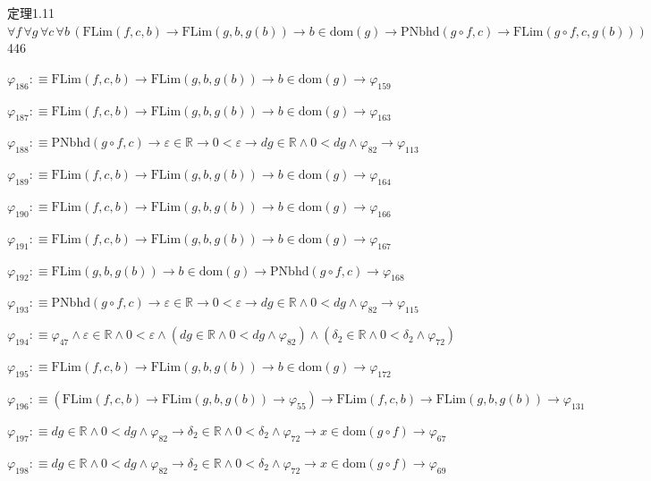 \begin{fullproof}{定理1.11}{$\forall f\,\forall g\,\forall c\,\forall b\,(\mathrm{FLim}(f,c,b) \to \mathrm{FLim}(g,b,g(b)) \to b \in \mathrm{dom}(g) \to \mathrm{PNbhd}(g \circ f,c) \to \mathrm{FLim}(g \circ f,c,g(b)))$}{446}
\begin{abbrevlist}
\item $\varphi_{186} :\equiv \mathrm{FLim}(f,c,b) \to \mathrm{FLim}(g,b,g(b)) \to b \in \mathrm{dom}(g) \to \varphi_{159}$
\item $\varphi_{187} :\equiv \mathrm{FLim}(f,c,b) \to \mathrm{FLim}(g,b,g(b)) \to b \in \mathrm{dom}(g) \to \varphi_{163}$
\item $\varphi_{188} :\equiv \mathrm{PNbhd}(g \circ f,c) \to \varepsilon \in \mathbb{R} \to 0 < \varepsilon \to \mathit{dg} \in \mathbb{R} \land 0 < \mathit{dg} \land \varphi_{82} \to \varphi_{113}$
\item $\varphi_{189} :\equiv \mathrm{FLim}(f,c,b) \to \mathrm{FLim}(g,b,g(b)) \to b \in \mathrm{dom}(g) \to \varphi_{164}$
\item $\varphi_{190} :\equiv \mathrm{FLim}(f,c,b) \to \mathrm{FLim}(g,b,g(b)) \to b \in \mathrm{dom}(g) \to \varphi_{166}$
\item $\varphi_{191} :\equiv \mathrm{FLim}(f,c,b) \to \mathrm{FLim}(g,b,g(b)) \to b \in \mathrm{dom}(g) \to \varphi_{167}$
\item $\varphi_{192} :\equiv \mathrm{FLim}(g,b,g(b)) \to b \in \mathrm{dom}(g) \to \mathrm{PNbhd}(g \circ f,c) \to \varphi_{168}$
\item $\varphi_{193} :\equiv \mathrm{PNbhd}(g \circ f,c) \to \varepsilon \in \mathbb{R} \to 0 < \varepsilon \to \mathit{dg} \in \mathbb{R} \land 0 < \mathit{dg} \land \varphi_{82} \to \varphi_{115}$
\item $\varphi_{194} :\equiv \varphi_{47} \land \varepsilon \in \mathbb{R} \land 0 < \varepsilon \land (\mathit{dg} \in \mathbb{R} \land 0 < \mathit{dg} \land \varphi_{82}) \land (\delta_{2} \in \mathbb{R} \land 0 < \delta_{2} \land \varphi_{72})$
\item $\varphi_{195} :\equiv \mathrm{FLim}(f,c,b) \to \mathrm{FLim}(g,b,g(b)) \to b \in \mathrm{dom}(g) \to \varphi_{172}$
\item $\varphi_{196} :\equiv (\mathrm{FLim}(f,c,b) \to \mathrm{FLim}(g,b,g(b)) \to \varphi_{55}) \to \mathrm{FLim}(f,c,b) \to \mathrm{FLim}(g,b,g(b)) \to \varphi_{131}$
\item $\varphi_{197} :\equiv \mathit{dg} \in \mathbb{R} \land 0 < \mathit{dg} \land \varphi_{82} \to \delta_{2} \in \mathbb{R} \land 0 < \delta_{2} \land \varphi_{72} \to x \in \mathrm{dom}(g \circ f) \to \varphi_{67}$
\item $\varphi_{198} :\equiv \mathit{dg} \in \mathbb{R} \land 0 < \mathit{dg} \land \varphi_{82} \to \delta_{2} \in \mathbb{R} \land 0 < \delta_{2} \land \varphi_{72} \to x \in \mathrm{dom}(g \circ f) \to \varphi_{69}$

\end{abbrevlist}
\end{fullproof}
